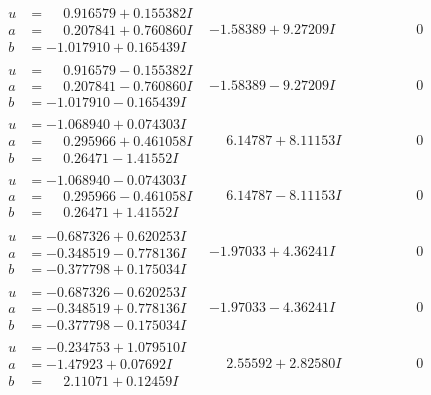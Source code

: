 \documentclass[1p]{elsarticle_modified}
\theoremstyle{definition}
\begin{document}
$$\begin{array}{c|c|c}
\begin{aligned}
u &= \phantom{-}0.916579 + 0.155382 I \\
a &= \phantom{-}0.207841 + 0.760860 I \\
b &= -1.017910 + 0.165439 I\end{aligned}
 & -1.58389 + 9.27209 I & \phantom{-0.000000 } 0 \\ \hline\begin{aligned}
u &= \phantom{-}0.916579 - 0.155382 I \\
a &= \phantom{-}0.207841 - 0.760860 I \\
b &= -1.017910 - 0.165439 I\end{aligned}
 & -1.58389 - 9.27209 I & \phantom{-0.000000 } 0 \\ \hline\begin{aligned}
u &= -1.068940 + 0.074303 I \\
a &= \phantom{-}0.295966 + 0.461058 I \\
b &= \phantom{-}0.26471 - 1.41552 I\end{aligned}
 & \phantom{-}6.14787 + 8.11153 I & \phantom{-0.000000 } 0 \\ \hline\begin{aligned}
u &= -1.068940 - 0.074303 I \\
a &= \phantom{-}0.295966 - 0.461058 I \\
b &= \phantom{-}0.26471 + 1.41552 I\end{aligned}
 & \phantom{-}6.14787 - 8.11153 I & \phantom{-0.000000 } 0 \\ \hline\begin{aligned}
u &= -0.687326 + 0.620253 I \\
a &= -0.348519 - 0.778136 I \\
b &= -0.377798 + 0.175034 I\end{aligned}
 & -1.97033 + 4.36241 I & \phantom{-0.000000 } 0 \\ \hline\begin{aligned}
u &= -0.687326 - 0.620253 I \\
a &= -0.348519 + 0.778136 I \\
b &= -0.377798 - 0.175034 I\end{aligned}
 & -1.97033 - 4.36241 I & \phantom{-0.000000 } 0 \\ \hline\begin{aligned}
u &= -0.234753 + 1.079510 I \\
a &= -1.47923 + 0.07692 I \\
b &= \phantom{-}2.11071 + 0.12459 I\end{aligned}
 & \phantom{-}2.55592 + 2.82580 I & \phantom{-0.000000 } 0 \\ \hline\begin{aligned}

\end{aligned}
\end{array}$$
\end{document}
